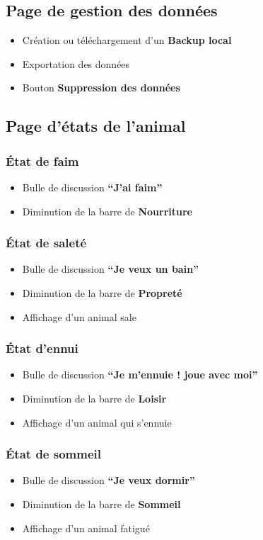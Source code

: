 \documentclass{conception_detaillee}
\begin{document}
\begin{itemize}[label=\textbullet]
\subsection{Page de gestion des données}
\begin{itemize}
    \item Création ou téléchargement d’un \textbf{Backup local}
    \item Exportation des données
    \item Bouton \textbf{Suppression des données}
\end{itemize}

\subsection{Page d’états de l’animal}
\subsubsection{État de faim}
\begin{itemize}
    \item Bulle de discussion \textbf{“J’ai faim”}
    \item Diminution de la barre de \textbf{Nourriture}
\end{itemize}

\subsubsection{État de saleté}
\begin{itemize}
    \item Bulle de discussion \textbf{“Je veux un bain”}
    \item Diminution de la barre de \textbf{Propreté}
    \item Affichage d’un animal sale
\end{itemize}

\subsubsection{État d’ennui}
\begin{itemize}
    \item Bulle de discussion \textbf{“Je m’ennuie ! joue avec moi”}
    \item Diminution de la barre de \textbf{Loisir}
    \item Affichage d’un animal qui s'ennuie
\end{itemize}

\subsubsection{État de sommeil}
\begin{itemize}
    \item Bulle de discussion \textbf{“Je veux dormir”}
    \item Diminution de la barre de \textbf{Sommeil}
    \item Affichage d’un animal fatigué
\end{itemize}


\end{itemize}
\end{document}
